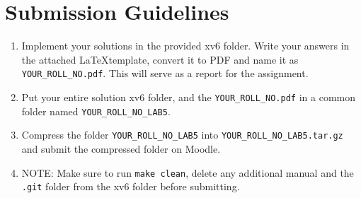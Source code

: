 \documentclass[11pt]{exam}
\begin{document}
\section*{Submission Guidelines}  
\begin{enumerate}
    \item Implement your solutions in the provided xv6 folder. Write your answers in the attached \LaTeX template, convert it to PDF and name it as \texttt{YOUR\_ROLL\_NO.pdf}. This will serve as a report for the assignment.
    \item Put your entire solution xv6 folder, and the \texttt{YOUR\_ROLL\_NO.pdf} in a common folder named \texttt{YOUR\_ROLL\_NO\_LAB5}. 
    \item Compress the folder \texttt{YOUR\_ROLL\_NO\_LAB5} into \texttt{YOUR\_ROLL\_NO\_LAB5.tar.gz} and submit the compressed folder on Moodle.
    \item NOTE: Make sure to run \texttt{make clean}, delete any additional manual and the \texttt{.git} folder from the xv6 folder before submitting.
\end{enumerate}
\end{document}
